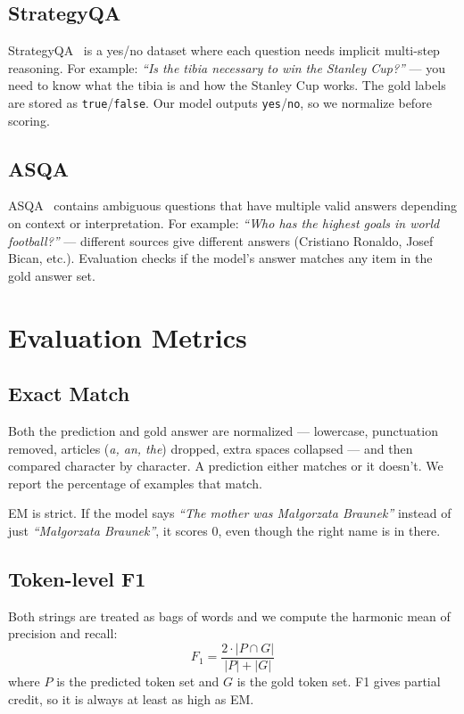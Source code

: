 \documentclass[conference]{IEEEtran}
\begin{document}
\subsection{StrategyQA}
StrategyQA~\cite{geva2021aristotle} is a yes/no dataset where
each question needs implicit multi-step reasoning. For example:
\emph{``Is the tibia necessary to win the Stanley Cup?''} — you
need to know what the tibia is and how the Stanley Cup works.
The gold labels are stored as \texttt{true}/\texttt{false}. Our
model outputs \texttt{yes}/\texttt{no}, so we normalize before
scoring.

\subsection{ASQA}
ASQA~\cite{stelmakh2022asqa} contains ambiguous questions that
have multiple valid answers depending on context or interpretation.
For example: \emph{``Who has the highest goals in world football?''}
— different sources give different answers (Cristiano Ronaldo, Josef
Bican, etc.). Evaluation checks if the model's answer matches any
item in the gold answer set.

\section{Evaluation Metrics}
\label{sec:metrics}

\subsection{Exact Match}
Both the prediction and gold answer are normalized — lowercase,
punctuation removed, articles (\emph{a, an, the}) dropped,
extra spaces collapsed — and then compared character by character.
A prediction either matches or it doesn't. We report the percentage
of examples that match.

EM is strict. If the model says \emph{``The mother was Małgorzata
Braunek''} instead of just \emph{``Małgorzata Braunek''}, it scores
0, even though the right name is in there.

\subsection{Token-level F1}
Both strings are treated as bags of words and we compute the
harmonic mean of precision and recall:
\begin{equation}
  F_1 = \frac{2 \cdot |P \cap G|}{|P| + |G|}
\end{equation}
where $P$ is the predicted token set and $G$ is the gold token set.
F1 gives partial credit, so it is always at least as high as EM.
\end{document}
